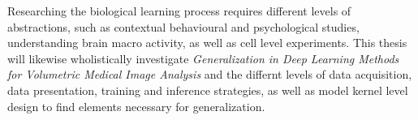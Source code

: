     Researching the biological learning process requires different levels of abstractions, such as contextual behavioural and psychological studies, understanding brain macro activity, as well as cell level experiments.
    This thesis will likewise wholistically investigate \emph{Generalization in Deep Learning Methods for Volumetric Medical Image Analysis} and the  differnt levels of data acquisition, data presentation, training and inference strategies, as well as model kernel level design to find elements necessary for generalization.









